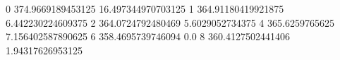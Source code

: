 0 374.9669189453125 16.497344970703125
1 364.91180419921875 6.442230224609375
2 364.0724792480469 5.6029052734375
4 365.6259765625 7.156402587890625
6 358.4695739746094 0.0
8 360.4127502441406 1.94317626953125

